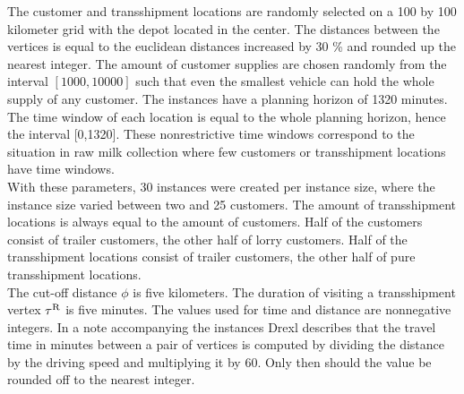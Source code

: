 The customer and transshipment locations are randomly selected on a 100 by 100 kilometer grid with the depot located in the center.
The distances between the vertices is equal to the euclidean distances increased by 30 \% and rounded up the nearest integer.
%
The amount of customer supplies are chosen randomly from the interval $[1000 , 10000]$ such that even the smallest vehicle can hold the whole supply of any customer.
%
The instances have a planning horizon of 1320 minutes.
The time window of each location is equal to the whole planning horizon, hence the interval [0,1320].
These nonrestrictive time windows correspond to
the situation in raw milk collection where  few
customers or transshipment locations have time windows. \\

%
With these parameters, 30 instances
were created per instance size, where the instance size varied between two and 25 customers.
%
%
The amount of transshipment locations is always equal to the amount of customers.
Half of the customers consist of trailer customers, the other half of lorry customers.
Half of the transshipment locations consist of trailer customers, the other half of pure transshipment locations.
%
\\

The cut-off distance $\phi $ is five kilometers.
%
The duration of visiting a transshipment vertex $\tau^{\rm R}$ is five minutes.
%
The values used for time and distance are nonnegative integers.
In a note accompanying the instances Drexl describes that the travel time in minutes between a pair of vertices is computed by dividing the distance by the driving speed and multiplying it by 60. Only then should the value be rounded off to the nearest integer.
\\




